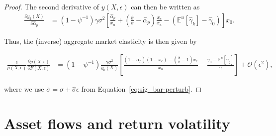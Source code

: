 \begin{proof}
	The second derivative of $y(X,\epsilon)$ can then be written as
	\begin{align}
	\frac{\partial y_2(X)}{\partial \hat{\alpha}_p}   &=\left(1-\psi^{-1}\right) \gamma \sigma^2 \left[\frac{\hat{\alpha}_p}{x_u}+ \left(\frac{\hat{\sigma}}{\sigma} - \hat{\alpha}_p \right)\frac{x_c}{x_u}- (\mathbb{E}^u[\hat{\gamma}_k]-\hat{\gamma}_0) \right] x_0. \nonumber 
	\end{align}
	
	Thus, the (inverse) aggregate market elasticity is then given by
	\begin{small}
		\begin{align}
		\frac{1}{p(X, \epsilon)} \frac{\partial p(X, \epsilon)}{\partial F(X, \epsilon)}
	&=  \left(1-\psi^{-1}\right)\frac{\gamma \sigma^2}{y_0(X)} \left[ \frac{(1-\overline{\alpha}_p)(1-x_c)-\left( \frac{\overline{\sigma}}{\sigma} -1\right)x_c}{x_u} - \frac{\gamma_0-\mathbb{E}^u\left[\gamma_j \right]}{\gamma}\right]+ \mathcal{O}(\epsilon^2),
		\end{align}
	\end{small}
where we use $ \overline{\sigma}=\sigma+\hat{\sigma}\epsilon $ from Equation~\eqref{eq:sig_bar-perturb}.
\end{proof}

%
%

\section{Asset flows and return volatility}
